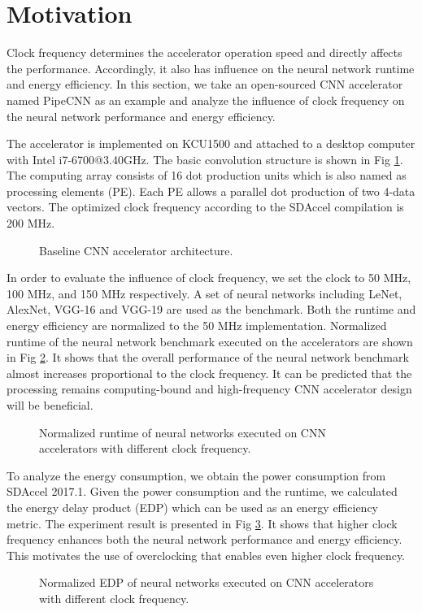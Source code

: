 \section{Motivation} \label{sec:motivation}
Clock frequency determines the accelerator operation speed 
and directly affects the performance. Accordingly, it also has influence on the 
neural network runtime and energy efficiency. In this section, we take 
an open-sourced CNN accelerator named PipeCNN \cite{pipecnn_2} as an example and analyze the 
influence of clock frequency on the neural network performance and energy efficiency.

The accelerator is implemented on KCU1500 and attached to a desktop computer with 
Intel i7-6700@3.40GHz. The basic convolution structure is shown in Fig \ref{fig:cnn-arch}. 
The computing array consists of 16 dot production units which is also named as 
processing elements (PE). Each PE allows a parallel dot production of two 4-data vectors.
The optimized clock frequency according to the SDAccel compilation 
is 200 MHz. 

\begin{figure}
    \caption{Baseline CNN accelerator architecture.}
\label{fig:cnn-arch}
\vspace{-1em}
\end{figure}

In order to evaluate the influence of clock 
frequency, we set the clock to 50 MHz, 100 MHz, and 150 MHz respectively.
A set of neural networks including LeNet, AlexNet, VGG-16 and VGG-19 are used as the benchmark.
Both the runtime and energy efficiency are normalized to the 50 MHz implementation.
Normalized runtime of the neural network benchmark executed on the accelerators are 
shown in Fig \ref{fig:computing-bound}. It shows that the 
overall performance of the neural network benchmark
almost increases proportional to the clock frequency. 
It can be predicted that the processing remains 
computing-bound and high-frequency CNN accelerator 
design will be beneficial.

\begin{figure}
    \caption{Normalized runtime of neural networks executed on CNN accelerators with different clock frequency.}
\label{fig:computing-bound}
\vspace{-1em}
\end{figure}

To analyze the energy consumption, we obtain the power consumption from SDAccel 2017.1. 
Given the power consumption and the runtime, 
we calculated the energy delay product (EDP) which can be used as an energy efficiency metric.
The experiment result is presented in Fig \ref{fig:edp}.
It shows that higher clock frequency 
enhances both the neural network performance and energy efficiency. 
This motivates the use of overclocking that enables even higher clock frequency.


\begin{figure}
	\vspace{-1em}
    \caption{Normalized EDP of neural networks executed on CNN accelerators with different clock frequency.}
\label{fig:edp}
\vspace{-1em}
\end{figure}



